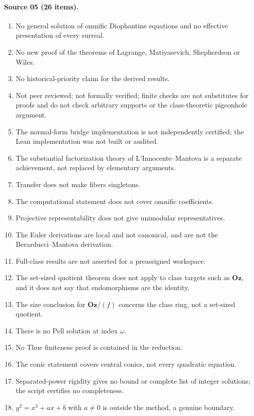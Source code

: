 \documentclass[11pt,oneside]{article}
\numberwithin{equation}{section}
\theoremstyle{definition}
\theoremstyle{remark}
\newcommand{\Oz}{\mathbf{Oz}}
\begin{document}
\paragraph{Source 05 (26 items).}
\begin{enumerate}[leftmargin=*,itemsep=1pt]
\item No general solution of omnific Diophantine equations and no effective
presentation of every surreal.
\item No new proof of the theorems of Lagrange, Matiyasevich, Shepherdson or
Wiles.
\item No historical-priority claim for the derived results.
\item Not peer reviewed; not formally verified; finite checks are not
substitutes for proofs and do not check arbitrary supports or the
class-theoretic pigeonhole argument.
\item The normal-form bridge implementation is not independently certified;
the Lean implementation was not built or audited.
\item The substantial factorization theory of L'Innocente--Mantova is a
separate achievement, not replaced by elementary arguments.
\item Transfer does not make fibers singletons.
\item The computational statement does not cover omnific coefficients.
\item Projective representability does not give unimodular representatives.
\item The Euler derivations are local and not canonical, and are not the
Berarducci--Mantova derivation.
\item Full-class results are not asserted for a preassigned workspace.
\item The set-sized quotient theorem does not apply to class targets such as
$\Oz$, and it does not say that endomorphisms are the identity.
\item The size conclusion for $\Oz/(f)$ concerns the class ring, not a
set-sized quotient.
\item There is no Pell solution at index $\omega$.
\item No Thue finiteness proof is contained in the reduction.
\item The conic statement covers central conics, not every quadratic
equation.
\item Separated-power rigidity gives no bound or complete list of integer
solutions; the script certifies no completeness.
\item $y^2=x^3+ax+b$ with $a\ne0$ is outside the method, a genuine boundary.

\end{enumerate}
\end{document}

